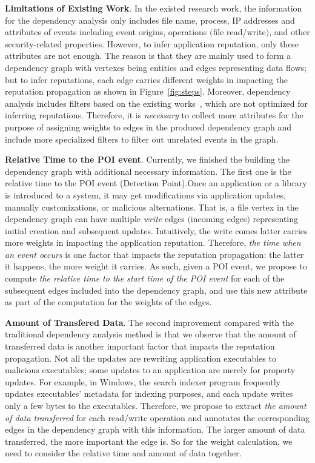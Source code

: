 \textbf{Limitations of Existing Work}.
In the existed research work, the information for the dependency analysis only includes file name, process, IP addresses and attributes of events including event origins, operations $($file read/write$)$, and other security-related properties. However, to infer application reputation, only these attributes are not enough.
The reason is that they are mainly used to form a dependency graph with vertexes being entities and edges representing data flows;
but to infer reputations, each edge carries different weights in impacting the reputation propagation as shown in Figure~\ref{fig:steps}.
Moreover, dependency analysis includes filters based on the existing works~\cite{backtracking,backtracking2}, which are not optimized for inferring reputations.
Therefore, it is \emph{necessary} to collect more attributes for the purpose of assigning weights to edges in the produced dependency graph and include more specialized filters to filter out unrelated events in the graph. 

\textbf{Relative Time to the POI event}.
Currently, we finished the building the dependency graph with additional necessary information. The first one is the relative time to the POI event (Detection Point).Once an application or a library is introduced to a system, it may get modifications via application updates, manually customizations, or malicious alternations. 
That is, a file vertex in the dependency graph can have multiple \emph{write} edges $($incoming edges$)$ representing initial creation and subsequent updates.
Intuitively, the write comes latter carries more weights in impacting the application reputation.
Therefore, \emph{the time when an event occurs} is one factor that impacts the reputation propagation: the latter it happens, the more weight it carries.
As such, given a POI event, we propose to compute \emph{the relative time to the start time of the POI event} for each of the subsequent edges included into the dependency graph,
and use this new attribute as part of the computation for the weights of the edges. 

\textbf{Amount of Transfered Data}.
The second  improvement compared with the traditional dependency analysis method is that we observe that the amount of transferred data is another important factor that impacts the reputation propagation. Not all the updates are rewriting application executables to malicious executables; some updates to an application are merely for property updates.
For example, in Windows, the search indexer program frequently updates executables' metadata for indexing purposes, and each update writes only a few bytes to the executables.
Therefore, we propose to extract \emph{the amount of data transferred} for each read/write operation and annotates the corresponding edges in the dependency graph with this information.
The larger amount of data transferred, the more important the edge is. So for the weight calculation, we need to consider the relative time and amount of data together.


